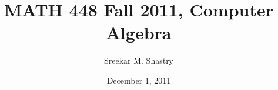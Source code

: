 \documentclass[10pt,a4paper,reqno]{amsart}
\begin{document}
\title{MATH 448 Fall 2011, Computer Algebra}

\date{December 1, 2011}

\author{Sreekar M. Shastry}
\maketitle
\tableofcontents


\end{document}
